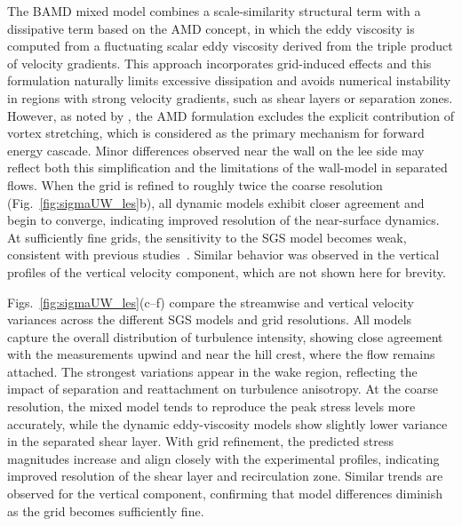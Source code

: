 \documentclass[%
superscriptaddress,
 amsmath,amssymb,
pra,
showkeys,
]{revtex4-2}
\begin{document}
The BAMD mixed model combines a scale-similarity structural term with a dissipative term based on the AMD concept, in which the eddy viscosity is computed from a fluctuating scalar eddy viscosity derived from the triple product of velocity gradients. This approach incorporates grid-induced effects and this formulation naturally limits excessive dissipation and avoids numerical instability in regions with strong velocity gradients, such as shear layers or separation zones. However, as noted by \citet{kamal2024artificial}, the AMD formulation excludes the explicit contribution of vortex stretching, which is considered as the primary mechanism for forward energy cascade. Minor differences observed near the wall on the lee side may reflect both this simplification and the limitations of the wall-model in separated flows. When the grid is refined to roughly twice the coarse resolution (Fig.~\ref{fig:sigmaUW_les}b), all dynamic models exhibit closer agreement and begin to converge, indicating improved resolution of the near-surface dynamics. At sufficiently fine grids, the sensitivity to the SGS model becomes weak, consistent with previous studies~\citep[e.g.,][]{meneveau2000scale}. Similar behavior was observed in the vertical profiles of the vertical velocity component, which are not shown here for brevity.

Figs.~\ref{fig:sigmaUW_les}(c--f) compare the streamwise and vertical velocity variances across the different SGS models and grid resolutions. All models capture the overall distribution of turbulence intensity, showing close agreement with the measurements upwind and near the hill crest, where the flow remains attached. The strongest variations appear in the wake region, reflecting the impact of separation and reattachment on turbulence anisotropy. At the coarse resolution, the mixed model tends to reproduce the peak stress levels more accurately, while the dynamic eddy-viscosity models show slightly lower variance in the separated shear layer. With grid refinement, the predicted stress magnitudes increase and align closely with the experimental profiles, indicating improved resolution of the shear layer and recirculation zone. Similar trends are observed for the vertical component, confirming that model differences diminish as the grid becomes sufficiently fine.
\end{document}
